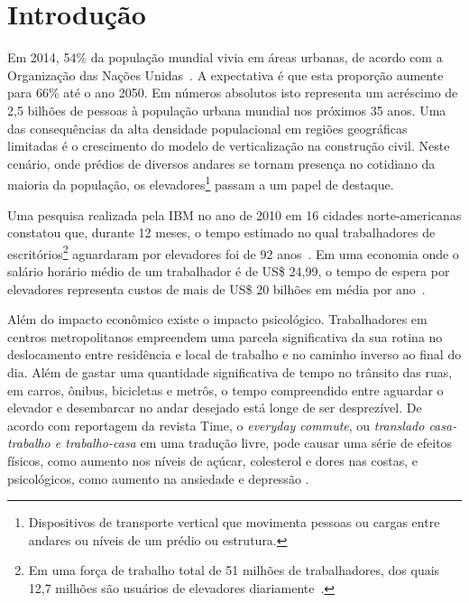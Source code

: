 \chapter{\label{chap:intro}Introdução}


Em 2014, 54\% da população mundial vivia em áreas urbanas, de acordo com a
Organização das Nações Unidas~\cite{UN14}. A expectativa é que esta proporção
aumente para 66\% até o ano 2050. Em números absolutos isto representa um
acréscimo de 2,5 bilhões de pessoas à população urbana mundial nos próximos 35
anos. Uma das consequências da alta densidade populacional em regiões
geográficas limitadas é o crescimento do modelo de verticalização na construção
civil. Neste cenário, onde prédios de diversos andares se tornam presença no
cotidiano da maioria da população, os elevadores\footnote{Dispositivos de
transporte vertical que movimenta pessoas ou cargas entre andares ou níveis de
um prédio ou estrutura.} passam a um papel de destaque.

Uma pesquisa realizada pela IBM no ano de 2010 em 16 cidades norte-americanas
constatou que, durante 12 meses, o tempo estimado no qual trabalhadores de
escritórios\footnote{Em uma força de trabalho total de 51 milhões de
trabalhadores, dos quais 12,7 milhões são usuários de elevadores
diariamente~\cite{IBM10}.} aguardaram por elevadores foi de 92
anos~\cite{IBM10}. Em uma economia onde o salário horário médio de um
trabalhador é de US\$ 24,99, o tempo de espera por elevadores representa custos
de mais de US\$ 20 bilhões em média por ano~\cite{BLS15}.

Além do impacto econômico existe o impacto psicológico. Trabalhadores em centros
metropolitanos empreendem uma parcela significativa da sua rotina no
deslocamento entre residência e local de trabalho e no caminho inverso ao final
do dia. Além de gastar uma quantidade significativa de tempo no trânsito das
ruas, em carros, ônibus, bicicletas e metrôs, o tempo compreendido entre
aguardar o elevador e desembarcar no andar desejado está longe de ser
desprezível. De acordo com reportagem da revista Time, o \textit{everyday
commute}, ou \textit{translado casa-trabalho e trabalho-casa} em uma tradução
livre, pode causar uma série de efeitos físicos, como aumento nos níveis de
açúcar, colesterol e dores nas costas, e psicológicos, como aumento na ansiedade
e depressão \cite{Kylstra14}.


